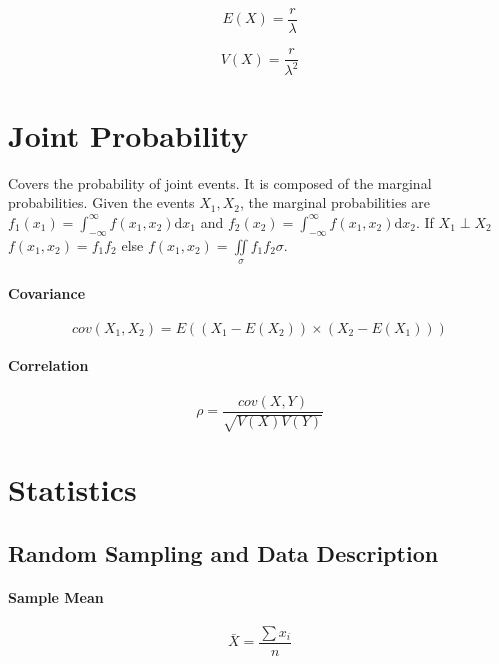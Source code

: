 \documentclass[a4paper, 10pt]{article}
\begin{document}
		\begin{equation*}
		E(X)=\frac{r}{\lambda}
		\end{equation*}

		\begin{equation*}
		V(X)=\frac{r}{\lambda ^2}
		\end{equation*}

	\newpage
	\section{Joint Probability}

	Covers the probability of joint events. It is composed of the marginal probabilities. Given the events \(X_1,X_2\), the marginal probabilities are \(f_1(x_1)=\int_{-\infty}^{\infty}f(x_1, x_2)\mathrm{d} x_1\) and \(f_2(x_2)=\int_{-\infty}^{\infty}f(x_1, x_2)\mathrm{d} x_2\). If \(X_1\perp X_2\) \(f(x_1,x_2)=f_1f_2\) else \(f(x_1,x_2)=\iint\limits_\sigma f_1f_2\sigma \).

	\paragraph{Covariance}

	\begin{equation*}
		cov(X_1, X_2)=E((X_1-E(X_2))\times(X_2-E(X_1)))
	\end{equation*}

	\paragraph{Correlation}

	\begin{equation*}
		\rho =\frac{cov(X,Y)}{\sqrt{V(X)V(Y)}}
	\end{equation*}

	\section{Statistics}

	\subsection{Random Sampling and Data Description}

	\paragraph{Sample Mean}

	\begin{equation*}
		\bar{X} = \frac{\sum x_i}{n}
	\end{equation*}
\end{document}
